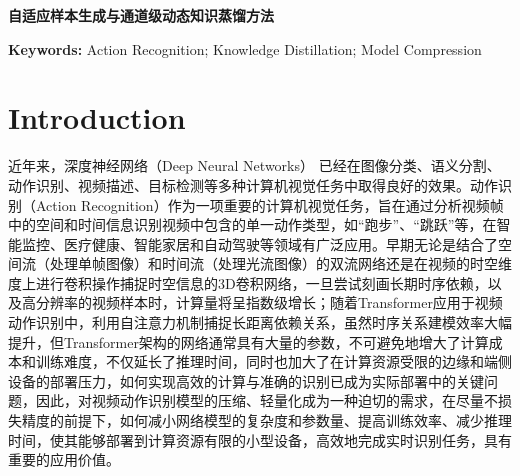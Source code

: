 \documentclass[10.5pt,letterpaper]{article}
\begin{document}
\begin{center}
	\textbf{\Large{自适应样本生成与通道级动态知识蒸馏方法}}
\end{center}

\begin{abstract}
Knowledge Distillation（KD）为压缩大型动作识别模型提供了一条有前景但尚未充分探索的途径。然而，现有的 KD 方法存在两个主要局限：1）对固定输入样本的依赖会导致冻结的教师模型（大模型）与可学习的学生模型（小模型）之间的特征对齐不够理想；2）对所有通道使用统一的蒸馏强度无法反映它们在捕获不同知识（例如动作节奏或幅度）时的重要性随训练阶段而变化。基于此，我们提出了一种自适应样本感知的通道级动态（ASCD）KD 方法，包括两个阶段。首先，我们使用自适应样本生成模块，通过结合样本梯度（由在每一层中由通道中心频率差异加权的特征损失最小化得到）中的语义来生成更新后的样本；同时，通过对频率特征应用高斯掩码来保留关键的运动相关细节。其次，我们采用通道级动态蒸馏模块，在这些生成的样本上训练学生模型，该过程由样本梯度和特征频率共同指导。为提高效率，样本是周期性更新的，而不是每个epoch都更新。在三个视频数据集（UCF101、Kinetics-400、Something-Something-V2）和两个图像数据集（CIFAR-100、ImageNet）上的大量实验表明，我们的方法达到了当前最先进的性能。。
\end{abstract}

\textbf{Keywords:} Action Recognition; Knowledge Distillation; Model Compression


\linenumbers  


\section{Introduction}
近年来，深度神经网络（Deep Neural Networks）\cite{krizhevsky-nips2012-imagenet}\cite{vaswani-nips2017-attention}\cite{gu-arxiv2023-mamba} 已经在图像分类、语义分割、动作识别、视频描述、目标检测等多种计算机视觉任务中取得良好的效果。动作识别（Action Recognition）作为一项重要的计算机视觉任务，旨在通过分析视频帧中的空间和时间信息识别视频中包含的单一动作类型，如“跑步”、“跳跃”等，在智能监控、医疗健康、智能家居和自动驾驶等领域有广泛应用。早期无论是结合了空间流（处理单帧图像）和时间流（处理光流图像）的双流网络还是在视频的时空维度上进行卷积操作捕捉时空信息的3D卷积网络，一旦尝试刻画长期时序依赖，以及高分辨率的视频样本时，计算量将呈指数级增长；随着Transformer应用于视频动作识别中，利用自注意力机制捕捉长距离依赖关系，虽然时序关系建模效率大幅提升，但Transformer架构的网络通常具有大量的参数，不可避免地增大了计算成本和训练难度，不仅延长了推理时间，同时也加大了在计算资源受限的边缘和端侧设备的部署压力，如何实现高效的计算与准确的识别已成为实际部署中的关键问题，因此，对视频动作识别模型的压缩、轻量化成为一种迫切的需求，在尽量不损失精度的前提下，如何减小网络模型的复杂度和参数量、提高训练效率、减少推理时间，使其能够部署到计算资源有限的小型设备，高效地完成实时识别任务，具有重要的应用价值。
\end{document}
